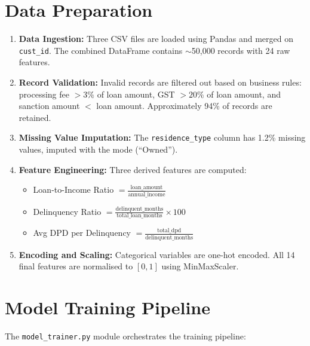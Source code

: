 \documentclass[12pt,a4paper]{report}
\begin{document}
\section{Data Preparation}

\begin{enumerate}
    \item \textbf{Data Ingestion:} Three CSV files are loaded using Pandas and merged on \texttt{cust\_id}. The combined DataFrame contains $\sim$50,000 records with 24 raw features.

    \item \textbf{Record Validation:} Invalid records are filtered out based on business rules: processing fee $>3\%$ of loan amount, GST $>20\%$ of loan amount, and sanction amount $<$ loan amount. Approximately 94\% of records are retained.

    \item \textbf{Missing Value Imputation:} The \texttt{residence\_type} column has 1.2\% missing values, imputed with the mode (``Owned'').

    \item \textbf{Feature Engineering:} Three derived features are computed:
    \begin{itemize}
        \item Loan-to-Income Ratio $= \frac{\text{loan\_amount}}{\text{annual\_income}}$
        \item Delinquency Ratio $= \frac{\text{delinquent\_months}}{\text{total\_loan\_months}} \times 100$
        \item Avg DPD per Delinquency $= \frac{\text{total\_dpd}}{\text{delinquent\_months}}$
    \end{itemize}

    \item \textbf{Encoding and Scaling:} Categorical variables are one-hot encoded. All 14 final features are normalised to $[0,1]$ using MinMaxScaler.
\end{enumerate}

\section{Model Training Pipeline}

The \texttt{model\_trainer.py} module orchestrates the training pipeline:
\end{document}
